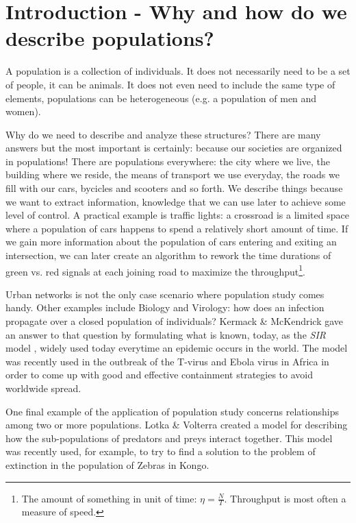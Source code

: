 
\section{Introduction - Why and how do we describe populations?}
\label{sec:intro}

A population is a collection of individuals. It does not necessarily need
to be a set of people, it can be animals. It does not even need to include the
same type of elements, populations can be heterogeneous (e.g. a population
of men and women).

Why do we need to describe and analyze these structures? There are many answers
but the most important is certainly: because our societies are organized in populations!
There are populations everywhere: the city where we live, the building where we reside,
the means of transport we use everyday, the roads we fill with our cars, bycicles and
scooters and so forth. We describe things because we want to extract information, knowledge
that we can use later to achieve some level of control. A practical example is traffic
lights: a crossroad is a limited space where a population of cars happens to spend a
relatively short amount of time.
If we gain more information about the population of cars entering and exiting an
intersection, we can later create an algorithm to rework the time durations of green vs.
red signals at each joining road to maximize the 
throughput\footnote{The amount of something in unit of time: $\eta = \frac{N}{T}$. 
Throughput is most often a measure of speed.}.

Urban networks is not the only case scenario where population study comes handy. Other
examples include Biology and Virology: how does an infection propagate over a closed
population of individuals? Kermack \& McKendrick \cite{kermack-mckendrick}
gave an answer to that question by formulating what is known, today, as the \textit{SIR} model
\cite{kermack-mckendrick-sir}, widely used today everytime an epidemic occurs in the world. The
model was recently used in the outbreak of the T-virus and Ebola virus in Africa in order to
come up with good and effective containment strategies to avoid worldwide spread.

One final example of the application of population study concerns relationships among two or more
populations. Lotka \& Volterra \cite{lotka-volterra} created a model for describing how
the sub-populations of predators and preys interact together. This model was recently used, for example,
to try to find a solution to the problem of extinction in the population of Zebras in Kongo.\\

